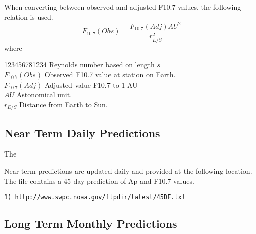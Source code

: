 When converting between observed and adjusted F10.7 values, the following relation is used.
%
\begin{equation}
F_{10.7}(Obs) = \frac{F_{10.7}(Adj)AU^2}{r_{E/S}^2}
\end{equation}
%
where
%
\begin{tabbing}
123456781234 \= Reynolds number based on length $s$ \kill\\
$F_{10.7}(Obs)$  \>   Observed F10.7 value at station on Earth. \\
$F_{10.7}(Adj)$  \>   Adjusted value F10.7 to 1 AU\\
$AU$  \>   Astonomical unit.\\
$r_{E/S}$  \>   Distance from Earth to Sun.\\
\end{tabbing}

\subsection{Near Term Daily Predictions}
The

Near term predictions are updated daily and provided at the following location.  The file contains a 45 day prediction
of Ap and F10.7 values.
\begin{small}
\begin{verbatim}
1) http://www.swpc.noaa.gov/ftpdir/latest/45DF.txt
\end{verbatim}
\end{small}

\subsection{Long Term Monthly Predictions}

